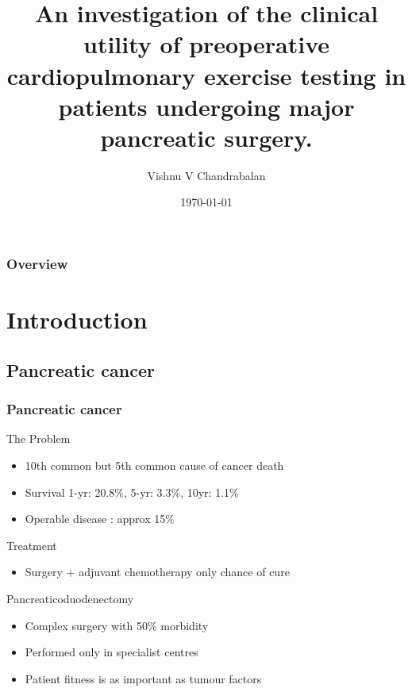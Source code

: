 \documentclass[10pt]{beamer}
\title[Improving Outcomes in Pancreatic Surgery]{An investigation of the clinical utility of preoperative cardiopulmonary exercise testing in patients undergoing major pancreatic surgery.} %
\author{Vishnu V Chandrabalan} %
\institute[UoG] %
{
University of Glasgow \\ %
\medskip
}
\date{\today} %
\begin{document}
\begin{frame}
\titlepage %
\end{frame}

\begin{frame}
\frametitle{Overview} %
\tableofcontents %
\end{frame}


\section{Introduction}
\subsection{Pancreatic cancer}
\begin{frame}
	\frametitle{Pancreatic cancer} %
	\begin{block}{The Problem}
		\begin{itemize}
			\item 10th common but 5th common cause of cancer death
			\item Survival	1-yr: 20.8\%, 5-yr: 3.3\%, 10yr: 1.1\%
			\item Operable disease : approx 15\%
		\end{itemize}
	\end{block}
	\begin{block}{Treatment}
		\begin{itemize}
			\item Surgery + adjuvant chemotherapy only chance of cure
		\end{itemize}
	\end{block}
	\begin{block}{Pancreaticoduodenectomy}
		\begin{itemize}
			\item Complex surgery with 50\% morbidity
			\item Performed only in specialist centres
			\item Patient fitness is as important as tumour factors
		\end{itemize}
	\end{block}
\end{frame}
\end{document}
